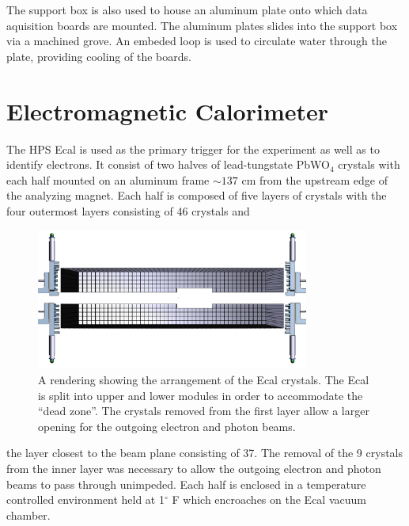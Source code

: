 The support box is also used to house an aluminum plate onto which data 
aquisition boards are mounted.  The aluminum plates slides into the support box
via a machined grove.  An embeded loop is used to circulate water through the
plate, providing cooling of the boards.


\section{Electromagnetic Calorimeter}

The HPS Ecal is used as the primary trigger for the experiment as well as to
identify electrons.  It consist of two halves of lead-tungstate 
PbWO$_4$ crystals with each half mounted on an aluminum frame $\sim 137$ cm 
from the upstream edge of the analyzing magnet.  Each half is composed of five
layers of crystals with the four outermost layers consisting of 46 crystals and 
\begin{figure}
    \centering
    \includegraphics[width=0.8\textwidth]{images/ecal_layout.png}
    \caption{A rendering showing the arrangement of the Ecal crystals.  The Ecal
             is split into upper and lower modules in order to accommodate the 
             ``dead zone''.  The crystals removed from the first layer allow
             a larger opening for the outgoing electron and photon beams.}
    \label{fig:ecal_layout}
\end{figure}
the layer closest to the beam plane consisting of 37. The removal of the 9 
crystals from the inner layer was necessary to allow the outgoing electron and
photon beams to pass through unimpeded.  Each half is enclosed in a temperature
controlled environment held at 1$^{\circ}$ F which encroaches on the Ecal 
vacuum chamber.

